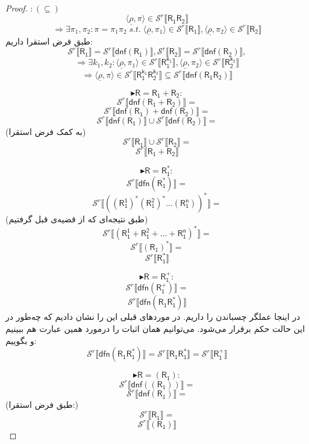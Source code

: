 \begin{proof}
	$:(\subseteq)$
	$$\langle \underline{\rho} ,\pi \rangle \in \mathcal{S}^r \llbracket \mathsf{R_1 R_2} \rrbracket$$
	$$\Rightarrow\exists \pi_1, \pi_2: \pi = \pi_1 \pi_2\;s.t.\;
	\langle \underline{\rho} , \pi_1 \rangle \in \mathcal{S}^r \llbracket \mathsf{R_1} \rrbracket
	,\langle \underline{\rho} , \pi_2 \rangle \in \mathcal{S}^r \llbracket \mathsf{R_2} \rrbracket$$
	طبق فرض استقرا داریم:
	$$\mathcal{S}^r \llbracket \mathsf{R_1} \rrbracket=
	\mathcal{S}^r \llbracket \mathsf{dnf(R_1)} \rrbracket,
	\mathcal{S}^r \llbracket \mathsf{R_2} \rrbracket=
	\mathcal{S}^r \llbracket \mathsf{dnf(R_2)} \rrbracket,
	$$
	$$\Rightarrow
	\exists k_1,k_2: \langle \underline{\rho} , \pi_1 \rangle \in 
	\mathcal{S}^r \llbracket \mathsf{R_1^{k_1}} \rrbracket,
	\langle \underline{\rho} , \pi_2 \rangle \in 
	\mathcal{S}^r \llbracket \mathsf{R_2^{k_2}} \rrbracket$$
	$$\Rightarrow
	\langle \underline{\rho} , \pi \rangle \in
	\mathcal{S}^r \llbracket \mathsf{R_1^{k_1} R_2^{k_2}} \rrbracket
	\subseteq \mathcal{S}^r \llbracket \mathsf{dnf(R_1 R_2)} \rrbracket
	$$ 
	
	
	$$\blacktriangleright \mathsf{R=R_1 + R_2:}$$	
	$$\mathcal{S}^r \llbracket \mathsf{dnf(R_1+R_2)} \rrbracket=$$
	$$\mathcal{S}^r \llbracket \mathsf{dnf(R_1)+dnf(R_2)} \rrbracket=$$
	$$\mathcal{S}^r \llbracket \mathsf{dnf(R_1)} \rrbracket \cup
	\mathcal{S}^r \llbracket \mathsf{dnf(R_2)} \rrbracket=$$
	(به کمک فرض استقرا)
	$$\mathcal{S}^r \llbracket \mathsf{R_1} \rrbracket \cup
	\mathcal{S}^r \llbracket \mathsf{R_2} \rrbracket=$$
	$$\mathcal{S}^r \llbracket \mathsf{R_1+R_2} \rrbracket$$
	
	$$\blacktriangleright \mathsf{R=R_1^*:}$$
	$$\mathcal{S}^r \llbracket \mathsf{dfn(R_1^*)} \rrbracket=$$
	$$\mathcal{S}^r \llbracket \mathsf{((R_1^1)^* (R_1^2)^* ... (R_1^n))^*} \rrbracket=$$
	(طبق نتیجه‌ای که از قضیه‌ی قبل گرفتیم)
	$$\mathcal{S}^r \llbracket \mathsf{(R_1^1+R_1^2+...+R_1^n)^*} \rrbracket=$$
	$$\mathcal{S}^r \llbracket \mathsf{(R_1)^*} \rrbracket=$$
	$$\mathcal{S}^r \llbracket \mathsf{R_1^*} \rrbracket$$
	
	$$\blacktriangleright \mathsf{R=R_1^+:}$$
	$$\mathcal{S}^r \llbracket \mathsf{dfn(R_1^+)} \rrbracket=$$
	$$\mathcal{S}^r \llbracket \mathsf{dfn(R_1 R_1^*)} \rrbracket$$
	در اینجا عملگر چسباندن را داریم. در موردهای قبلی این را نشان دادیم که چه‌طور در این حالت حکم برقرار می‌شود. می‌توانیم همان اثبات را درمورد همین عبارت هم ببینیم و بگوییم:
	$$\mathcal{S}^r \llbracket \mathsf{dfn(R_1 R_1^*)} \rrbracket=
	\mathcal{S}^r \llbracket \mathsf{R_1 R_1^*} \rrbracket=
	\mathcal{S}^r \llbracket \mathsf{R_1^+} \rrbracket$$
	
	$$\blacktriangleright \mathsf{R=(R_1):}$$
	$$\mathcal{S}^r \llbracket \mathsf{dnf((R_1))} \rrbracket=$$
	$$\mathcal{S}^r \llbracket \mathsf{dnf(R_1)} \rrbracket=$$
	(طبق فرض استقرا:)
	$$\mathcal{S}^r \llbracket \mathsf{R_1} \rrbracket=$$
	$$\mathcal{S}^r \llbracket \mathsf{(R_1)} \rrbracket$$
\end{proof}



